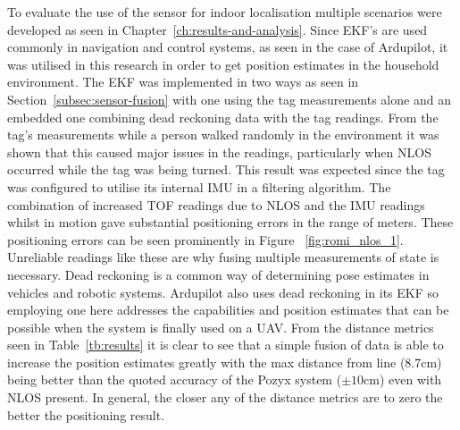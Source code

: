To evaluate the use of the sensor for indoor localisation multiple scenarios were developed as seen in Chapter~\ref{ch:results-and-analysis}.
Since EKF's are used commonly in navigation and control systems, as seen in the case of Ardupilot, it was utilised in this research in order to get position estimates in the household environment.
The EKF was implemented in two ways as seen in Section~\ref{subsec:sensor-fusion} with one using the tag measurements alone and an embedded one combining dead reckoning data with the tag readings.
From the tag's measurements while a person walked randomly in the environment it was shown that this caused major issues in the readings, particularly when NLOS occurred while the tag was being turned.
This result was expected since the tag was configured to utilise its internal IMU in a filtering algorithm.
The combination of increased TOF readings due to NLOS and the IMU readings whilst in motion gave substantial positioning errors in the range of meters.
These positioning errors can be seen prominently in Figure ~\ref{fig:romi_nlos_1}.
Unreliable readings like these are why fusing multiple measurements of state is necessary.
Dead reckoning is a common way of determining pose estimates in vehicles and robotic systems.
Ardupilot also uses dead reckoning in its EKF so employing one here addresses the capabilities and position estimates that can be possible when the system is finally used on a UAV.
From the distance metrics seen in Table~\ref{tb:results} it is clear to see that a simple fusion of data is able to increase the position estimates greatly with the max distance from line (8.7cm) being better than the quoted accuracy of the Pozyx system ($\pm10$cm) even with NLOS present.
In general, the closer any of the distance metrics are to zero the better the positioning result.


